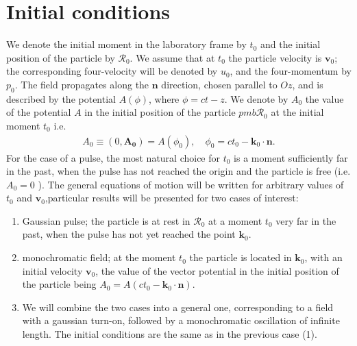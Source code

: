 


\section{Initial conditions}\label{sec:initial-conditions}
We denote the initial moment in the laboratory frame by $t_{0}$ and the initial position of the particle by $\boldsymbol{\mathcal { R }}_{0}$. We assume that at $t_{0}$ the particle velocity is $\mathbf{v}_{0}$; the corresponding four-velocity will be denoted by $u_{0}$, and the four-momentum by $p_{0}$. The field propagates along the $\mathbf{n}$ direction, chosen parallel to $O z$, and is described by the potential $A(\phi)$, where $\phi=c t-z$. We denote by $A_{0}$ the value of the potential $A$ in the initial position of the particle $p m b \mathcal{R}_{0}$ at the initial moment $t_{0}$ i.e.
\begin{align}
  A_{0} \equiv\left(0, \mathbf{A}_{\mathbf{0}}\right)=A\left(\phi_{0}\right), \quad \phi_{0}=c t_{0}-\mathbf{k}_{0} \cdot \mathbf{n} . \label{II.2.2.1}
\end{align}
For the case of a pulse, the most natural choice for $t_{0}$ is a moment sufficiently far in the past, when the pulse has not reached the origin and the particle is free (i.e. $A_{0}=0$ ). The general equations of motion will be written for arbitrary values of $t_{0}$ and $\mathbf{v}_{0}$,particular results will be presented for two cases of interest:
\begin{enumerate}
  \item Gaussian pulse; the particle is at rest in $\boldsymbol{\mathcal { R }}_{0}$ at a moment $t_{0}$ very far in the past, when the pulse has not yet reached the point $\boldsymbol{k}_{0}$.
  \item monochromatic field; at the moment $t_{0}$ the particle is located in $\mathbf{k}_{0}$, with an initial velocity $\mathbf{v}_{0}$, the value of the vector potential in the initial position of the particle being $A_{0}=A\left(c t_{0}-\mathbf{k}_{0} \cdot \mathbf{n}\right)$.
  \item We will combine the two cases into a general one, corresponding to a field with a gaussian turn-on, followed by a monochromatic oscillation of infinite length. The initial conditions are the same as in the previous case (1).
\end{enumerate}

